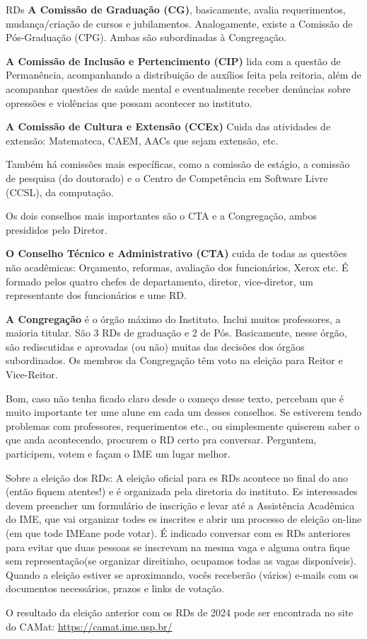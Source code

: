 \begin{subsecao}{RDs}
{\bf A Comissão de Graduação (CG)}, basicamente, avalia requerimentos,
mudança/criação de cursos e jubilamentos. Analogamente, existe a Comissão de
Pós-Graduação (CPG). Ambas são subordinadas à Congregação.

{\bf A Comissão de Inclusão e Pertencimento (CIP)} lida com a questão de Permanência,
acompanhando a distribuição de auxílios feita pela reitoria, além de acompanhar
questões de saúde mental e eventualmente receber denúncias sobre opressões e 
violências que possam acontecer no instituto.

{\bf A Comissão de Cultura e Extensão (CCEx)} Cuida das atividades de extensão: 
Matemateca, CAEM, AACs que sejam extensão, etc.

Também há comissões mais específicas, como a comissão de estágio, a comissão de
pesquisa (do doutorado) e o Centro de Competência em Software Livre (CCSL), da
computação.

Os dois conselhos mais importantes são o CTA e a Congregação, ambos presididos
pelo Diretor.

{\bf O Conselho Técnico e Administrativo (CTA)} cuida de todas as questões não
acadêmicas: Orçamento, reformas, avaliação dos funcionários, Xerox etc. É
formado pelos quatro chefes de departamento, diretor, vice-diretor, um
representante dos funcionários e ume RD.

{\bf A Congregação} é o órgão máximo do Instituto. Inclui muitos professores, a
maioria titular. São 3 RDs de graduação e 2 de Pós. Basicamente,
nesse órgão, são rediscutidas e aprovadas (ou não) muitas das decisões
dos órgãos subordinados. Os membros da Congregação têm voto na eleição para
Reitor e Vice-Reitor.

Bom, caso não tenha ficado claro desde o começo desse texto, percebam que é
muito importante ter ume alune em cada um desses conselhos. Se estiverem tendo
problemas com professores, requerimentos etc., ou simplesmente quiserem saber
o que anda acontecendo, procurem o RD certo pra conversar. Perguntem,
participem, votem e façam o IME um lugar melhor.

Sobre a eleição dos RDs: A eleição oficial para es RDs acontece no final do ano
(então fiquem atentes!) e é organizada pela diretoria do instituto. Es
interessades devem preencher um formulário de inscrição e levar até a
Assistência Acadêmica do IME, que vai organizar todes es inscrites e abrir um
processo de eleição on-line (em que tode IMEane pode votar). É indicado conversar
com es RDs anteriores para evitar que duas pessoas se inscrevam na mesma vaga e
alguma outra fique sem representação(se organizar direitinho, ocupamos todas as vagas
disponíveis). Quando a eleição
estiver se aproximando, vocês receberão (vários) e-mails com os documentos
necessários, prazos e links de votação.

O resultado da eleição anterior com os RDs de 2024 pode ser encontrada no site
do CAMat:
\url{https://camat.ime.usp.br/}


\end{subsecao}
